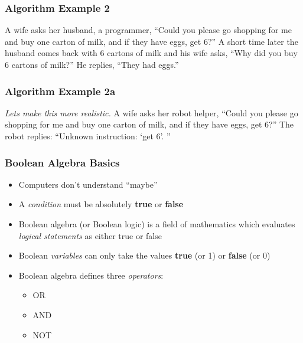 \documentclass[14pt]{beamer}
\begin{document}
\begin{frame}
\frametitle{Algorithm Example 2}
A wife asks her husband, a programmer, ``Could you please go shopping for me and buy one carton of milk, and if they have eggs, get 6?”
\linebreak \linebreak
A short time later the husband comes back with 6 cartons of milk and his wife asks, ``Why did you buy 6 cartons of milk?”
\linebreak \linebreak
He replies, “They had eggs.”
\end{frame}

\begin{frame}
\frametitle{Algorithm Example 2a}
\textit{Lets make this more realistic.}
\linebreak \linebreak
A wife asks her robot helper, ``Could you please go shopping for me and buy one carton of milk, and if they have eggs, get 6?”
\linebreak \linebreak
The robot replies: ``Unknown instruction: `get 6'. ''
\end{frame}

\begin{frame} %
\frametitle{Boolean Algebra Basics}
\begin{itemize}
\item Computers don't understand ``maybe''
\item A \textit{condition} must be absolutely \textbf{true} or \textbf{false}
\item Boolean algebra (or Boolean logic) is a field of mathematics which evaluates \textit{logical statements} as either true or false
\item Boolean \textit{variables} can only take the values \textbf{true} (or 1) or \textbf{false} (or 0)
\item Boolean algebra defines three \textit{operators}:
	\begin{itemize}
		\item OR
		\item AND
		\item NOT
	\end{itemize}
\end{itemize}
\end{frame}
\end{document}
